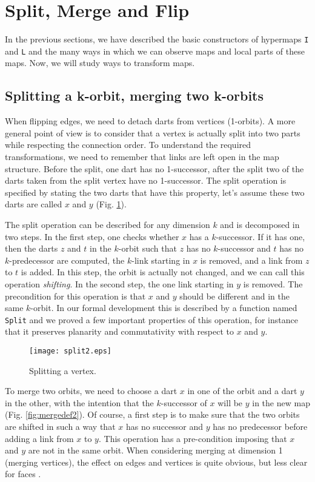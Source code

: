 \documentclass{llncs}
\begin{document}
\section{Split, Merge and Flip}
\label{FL}
In the previous sections, we have described the basic constructors of
hypermaps {\tt I} and {\tt L} and the many ways in
which we can observe maps and local parts of these maps.  Now, we will
study ways to transform maps.

\subsection{Splitting a k-orbit, merging two k-orbits}
When flipping edges, we need to detach darts from vertices (1-orbits).
A more general point of view is to consider that a vertex is actually
split into two parts while respecting the connection order.  To
understand the required transformations, we need to remember that links
are left open in the map structure. Before the split, one dart
has no 1-successor, after the split two of the darts taken from the split
vertex have no 1-successor.  The split operation is specified by stating the
two darts that have this property, let's assume these two darts are called
\(x\) and \(y\) (Fig. \ref{fig:split2}).

The split operation can be described for any dimension \(k\) and is
decomposed in two steps.  In the first step, one checks whether \(x\)
has a \(k\)-successor.  If it has one, then the darts \(z\) and \(t\)
in the \(k\)-orbit such that \(z\) has no \(k\)-successor and \(t\)
has no \(k\)-predecessor are computed, the \(k\)-link starting in
\(x\) is removed, and a link from \(z\) to \(t\) is added.  In this
step, the orbit is actually not changed, and we can call this operation
{\em shifting}.  In the second step, the one
link starting in \(y\) is removed.  The precondition for this
operation is that \(x\) and \(y\) should be different and in the same
\(k\)-orbit.  In our formal development this is described by a
function named {\tt Split} and we proved a few important properties of this operation, for instance that it preserves planarity and
commutativity with respect to \(x\) and \(y\).
\begin{figure}
\begin{center}
\texttt{[image: split2.eps]}
\end{center}
\caption{Splitting a vertex.}
\label{fig:split2}
\end{figure}

To merge two orbits, we need to choose a dart \(x\) in one of the
orbit and a dart \(y\) in the other, with the intention that the
\(k\)-successor of \(x\) will be \(y\) in the new map (Fig. \ref{fig:mergedef2}).  Of course, a
first step is to make sure that the two orbits are shifted in such a way
that \(x\) has no successor and \(y\) has no predecessor before adding
a link from \(x\) to \(y\). This operation has a pre-condition imposing that \(x\) and \(y\) are not in the same orbit.  When considering merging at dimension 1 (merging vertices), the effect on edges and vertices is quite obvious, but less clear for faces \cite{duf08a,duf09b}.
\end{document}
